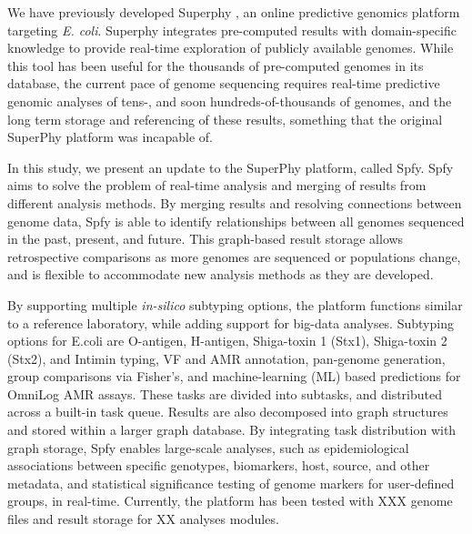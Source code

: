 \documentclass[a4,center,fleqn]{NAR}
\begin{document}
We have previously developed Superphy \citep{whiteside2016superphy}, an online predictive genomics platform targeting \textit{E. coli}. Superphy integrates pre-computed results with domain-specific knowledge to provide real-time exploration of publicly available genomes. While this tool has been useful for the thousands of pre-computed genomes in its database, the current pace of genome sequencing requires real-time predictive genomic analyses of tens-, and soon hundreds-of-thousands of genomes, and the long term storage and referencing of these results, something that the original SuperPhy platform was incapable of.


In this study, we present an update to the SuperPhy platform, called Spfy. Spfy aims to solve the problem of real-time analysis and merging of results from different analysis methods. By merging results and resolving connections between genome data, Spfy is able to identify relationships between all genomes sequenced in the past, present, and future. This graph-based result storage allows retrospective comparisons as more genomes are sequenced or populations change, and is flexible to accommodate new analysis methods as they are developed.


By supporting multiple \textit{in-silico} subtyping options, the platform functions similar to a reference laboratory, while adding support for big-data analyses. Subtyping options for E.coli are O-antigen, H-antigen, Shiga-toxin 1 (Stx1), Shiga-toxin 2 (Stx2), and Intimin typing, VF and AMR annotation, pan-genome generation, group comparisons via Fisher's, and machine-learning (ML) based predictions for OmniLog AMR assays. These tasks are divided into subtasks, and distributed across a built-in task queue. Results are also decomposed into graph structures and stored within a larger graph database. By integrating task distribution with graph storage, Spfy enables large-scale analyses, such as epidemiological associations between specific genotypes, biomarkers, host, source, and other metadata, and statistical significance testing of genome markers for user-defined groups, in real-time. Currently, the platform has been tested with XXX genome files and result storage for XX analyses modules.
\end{document}
